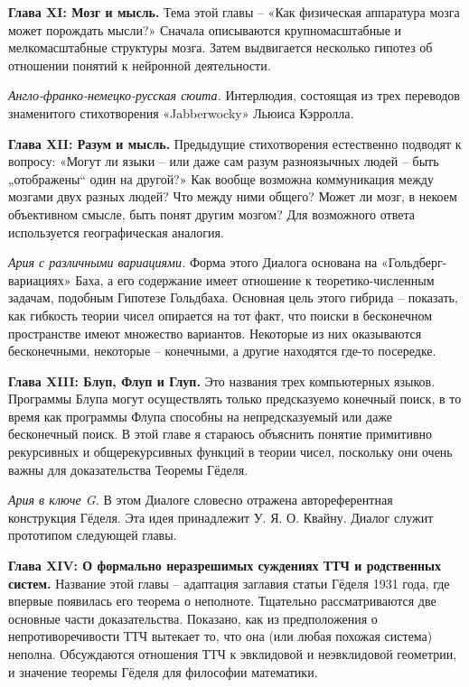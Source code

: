 \documentclass[../main.tex]{subfiles}
\begin{document}
\textbf{Глава XI: Мозг и мысль.}
Тема этой главы \--- «Как физическая аппаратура мозга может порождать мысли?» Сначала описываются крупномасштабные и мелкомасштабные структуры мозга. Затем выдвигается несколько гипотез об отношении понятий к нейронной деятельности.

\emph{Англо-франко-немецко-русская сюита.}
Интерлюдия, состоящая из трех переводов знаменитого стихотворения «Jabberwocky» Льюиса Кэрролла.

\textbf{Глава XII: Разум и мысль.}
Предыдущие стихотворения естественно подводят к вопросу: «Могут ли языки \--- или даже сам разум разноязычных людей \--- быть „отображены`` один на другой?» Как вообще возможна коммуникация между мозгами двух разных людей? Что между ними общего? Может ли мозг, в некоем объективном смысле, быть понят другим мозгом? Для возможного ответа используется географическая аналогия.

\emph{Ария с различными вариациями.}
Форма этого Диалога основана на «Гольдберг-вариациях» Баха, а его содержание имеет отношение к теоретико-численным задачам, подобным Гипотезе Гольдбаха. Основная цель этого гибрида \--- показать, как гибкость теории чисел опирается на тот факт, что поиски в бесконечном пространстве имеют множество вариантов. Некоторые из них оказываются бесконечными, некоторые \--- конечными, а другие находятся где-то посередке.

\textbf{Глава XIII: Блуп, Флуп и Глуп.}
Это названия трех компьютерных языков. Программы Блупа могут осуществлять только предсказуемо конечный поиск, в то время как программы Флупа способны на непредсказуемый или даже бесконечный поиск. В этой главе я стараюсь объяснить понятие примитивно рекурсивных и общерекурсивных функций в теории чисел, поскольку они очень важны для доказательства Теоремы Гёделя.

\emph{Ария в ключе G.}
В этом Диалоге словесно отражена автореферентная конструкция Гёделя. Эта идея принадлежит У. Я. О. Квайну. Диалог служит прототипом следующей главы.

\textbf{Глава XIV: О формально неразрешимых суждениях ТТЧ и родственных систем.}
Название этой главы \--- адаптация заглавия статьи Гёделя 1931 года, где впервые появилась его теорема о неполноте. Тщательно рассматриваются две основные части доказательства. Показано, как из предположения о непротиворечивости ТТЧ вытекает то, что она (или любая похожая система) неполна. Обсуждаются отношения ТТЧ к эвклидовой и неэвклидовой геометрии, и значение теоремы Гёделя для философии математики.
\end{document}
